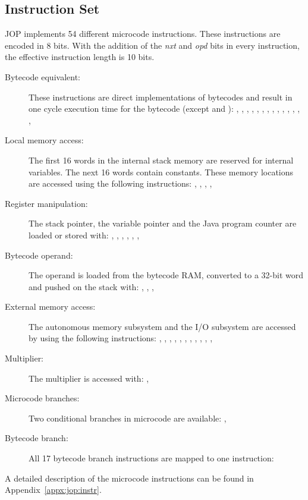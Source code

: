 \subsection{Instruction Set}

JOP implements 54 different microcode instructions. These
instructions are encoded in 8 bits. With the addition of the
\emph{nxt} and \emph{opd} bits in every instruction, the effective
instruction length is 10 bits.

\begin{description}
    \item[Bytecode equivalent:]
These instructions are direct implementations of bytecodes and
result in one cycle execution time for the bytecode (except
 and ): , , ,
, , , , ,
, , , , ,
, 

    \item[Local memory access:]
The first 16 words in the internal stack memory are reserved for
internal variables. The next 16 words contain constants. These
memory locations are accessed using the following instructions:
, , , , 

    \item[Register manipulation:]
The stack pointer, the variable pointer and the Java program counter
are loaded or stored with: , , ,
, , , 

    \item[Bytecode operand:]
The operand is loaded from the bytecode RAM, converted to a 32-bit
word and pushed on the stack with: ,
, , 

    \item[External memory access:] The autonomous memory
        subsystem and the I/O subsystem are accessed by using the
        following instructions: , ,
        , , , ,
        , , ,
        , , 

    \item[Multiplier:]
The multiplier is accessed with: , 

    \item[Microcode branches:]
Two conditional branches in microcode are available: ,

    \item[Bytecode branch:]
All 17 bytecode branch instructions are mapped to one instruction:

\end{description}
%
A detailed description of the microcode instructions can be found in
Appendix~\ref{appx:jop:instr}.


